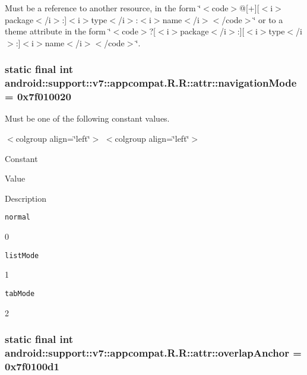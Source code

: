 Must be a reference to another resource, in the form \char`\"{}$<$code$>$@\mbox{[}+\mbox{]}\mbox{[}$<$i$>$package$<$/i$>$:\mbox{]}$<$i$>$type$<$/i$>$:$<$i$>$name$<$/i$>$$<$/code$>$\char`\"{} or to a theme attribute in the form \char`\"{}$<$code$>$?\mbox{[}$<$i$>$package$<$/i$>$:\mbox{]}\mbox{[}$<$i$>$type$<$/i$>$:\mbox{]}$<$i$>$name$<$/i$>$$<$/code$>$\char`\"{}. \hypertarget{classandroid_1_1support_1_1v7_1_1appcompat_1_1_r_1_1attr_a66aac0e39a018298c9630401244a39d}{
\subsubsection[{navigationMode}]{\setlength{\rightskip}{0pt plus 5cm}static final int android::support::v7::appcompat.R.R::attr::navigationMode = 0x7f010020}}
\label{classandroid_1_1support_1_1v7_1_1appcompat_1_1_r_1_1attr_a66aac0e39a018298c9630401244a39d}


Must be one of the following constant values. \begin{TabularC}{0}
\hline
\end{TabularC}
$<$colgroup align=\char`\"{}left\char`\"{}$>$ $<$colgroup align=\char`\"{}left\char`\"{}$>$ 

Constant

Value

Description 

{\tt normal}

0

{\tt listMode}

1

{\tt tabMode}

2\hypertarget{classandroid_1_1support_1_1v7_1_1appcompat_1_1_r_1_1attr_bd2d3dcc8cc16f0d649053fe7c00219e}{
\subsubsection[{overlapAnchor}]{\setlength{\rightskip}{0pt plus 5cm}static final int android::support::v7::appcompat.R.R::attr::overlapAnchor = 0x7f0100d1}}
\label{classandroid_1_1support_1_1v7_1_1appcompat_1_1_r_1_1attr_bd2d3dcc8cc16f0d649053fe7c00219e}


